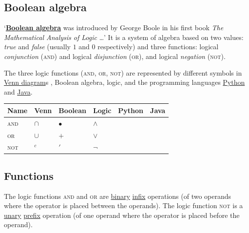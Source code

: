 \documentclass[11pt]{article}%
\begin{document}
\begin{multicols}{2}
\section{Boolean algebra}
\label{Boolean}

`\textbf{\href{https://en.wikipedia.org/wiki/Boolean_algebra}{Boolean algebra}} \citep{wiki:boolean-algebra} was introduced by George Boole in his first book \textit{The Mathematical Analysis of Logic} \citep{book:mathematical-analysis-of-logic}\dots' It is a system of algebra based on two values: \textit{true} and \textit{false} (usually $1$ and $0$ respectively) and three functions: logical \textit{conjunction} (\textsc{and}) and logical \textit{disjunction} (\textsc{or}), and logical \textit{negation} (\textsc{not}).

The three logic functions (\textsc{and}, \textsc{or}, \textsc{not}) are represented by different symbols in \href{https://en.wikipedia.org/wiki/Venn_diagram}{Venn diagram}s \citep{wiki:venn-diagram}, Boolean algebra, logic, and the programming languages \href{http://python.org/}{Python} and \href{https://java.oracle.com}{Java}.

\small{\begin{tabularx}{1.0\linewidth}{@{}Y|Y|Y|Y|Y|Y@{}}
Name & Venn & Boolean & Logic & Python & Java \\\hline
\textsc{and} & $\cap$ & $\bullet$ & $\wedge$ &  & \code{\&\&} \\
\textsc{or} & $\cup$ & $+$ & $\vee$ &  & \code{||} \\
\textsc{not} & $^{c}$ & $'$ & $\neg$ &  & \code{!} \\
\end{tabularx}}


\subsection{Functions}
\label{Functions}

The logic functions \textsc{and} and \textsc{or} are \href{https://en.wikipedia.org/wiki/Binary_operation}{binary} \href{https://en.wikipedia.org/wiki/Infix_notation}{infix} operations (of two operands where the operator is placed between the operands). The logic function \textsc{not} is a \href{https://en.wikipedia.org/wiki/Unary_operation}{unary} \href{https://en.wikipedia.org/wiki/Polish_notation}{prefix} operation (of one operand where the operator is placed before the operand).


\end{multicols}
\end{document}
